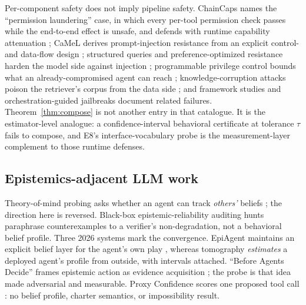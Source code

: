 Per-component safety does not imply pipeline safety. ChainCaps names the
``permission laundering'' case, in which every per-tool permission check
passes while the end-to-end effect is unsafe, and defends with runtime
capability attenuation \cite{chaincaps2026}; CaMeL derives prompt-injection
resistance from an explicit control- and data-flow design \cite{camel2026};
structured queries and preference-optimized resistance harden the model
side against injection \cite{struq2025,secalign2025}; programmable privilege
control bounds what an already-compromised agent can reach
\cite{progent2025}; knowledge-corruption attacks poison the retriever's
corpus from the data side \cite{poisonedrag2025}; and framework studies
\cite{orchestration2026} and orchestration-guided jailbreaks
\cite{orchjail2026} document related failures. Theorem~\ref{thm:compose} is
not another entry in that catalogue. It is the estimator-level analogue: a
confidence-interval behavioral certificate at tolerance $\tau$ fails to
compose, and E8's interface-vocabulary probe is the measurement-layer
complement to those runtime defenses.

\subsection{Epistemics-adjacent LLM work}

Theory-of-mind probing asks whether an agent can track \emph{others'}
beliefs \cite{strachan2024}; the direction here is reversed. Black-box
epistemic-reliability auditing \cite{eraudit} hunts paraphrase
counterexamples to a verifier's non-degradation, not a behavioral belief
profile. Three 2026 systems mark the convergence. EpiAgent maintains an
explicit belief layer for the agent's own play \cite{epiagent}, whereas
tomography \emph{estimates} a deployed agent's profile from outside, with
intervals attached. ``Before Agents Decide'' frames epistemic action as
evidence acquisition \cite{beforedecide}; the probe is that idea made
adversarial and measurable. Proxy Confidence scores one proposed tool call
\cite{proxyconfidence}: no belief profile, charter semantics, or
impossibility result.
